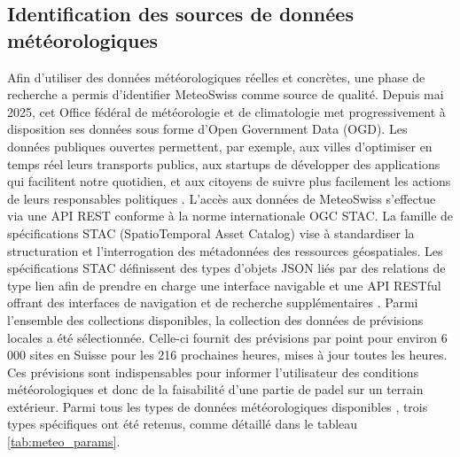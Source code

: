 \documentclass[12pt]{article}
\begin{document}
\subsection{Identification des sources de données météorologiques}

Afin d'utiliser des données météorologiques réelles et concrètes, une phase de recherche a permis d'identifier MeteoSwiss comme source de qualité. Depuis mai 2025, cet Office fédéral de météorologie et de climatologie met progressivement à disposition ses données sous forme d'Open Government Data (OGD). Les données publiques ouvertes permettent, par exemple, aux villes d'optimiser en temps réel leurs transports publics, aux startups de développer des applications qui facilitent notre quotidien, et aux citoyens de suivre plus facilement les actions de leurs responsables politiques \parencite{office_federal_de_la_statistique_quest-ce_2026}. 
\newline\newline
L'accès aux données de MeteoSwiss s'effectue via une API REST conforme à la norme internationale OGC STAC. La famille de spécifications STAC (SpatioTemporal Asset Catalog) vise à standardiser la structuration et l'interrogation des métadonnées des ressources géospatiales. Les spécifications STAC définissent des types d'objets JSON liés par des relations de type lien afin de prendre en charge une interface navigable et une API RESTful offrant des interfaces de navigation et de recherche supplémentaires \parencite[trad. de][]{open_geospatial_consortium_spatiotemporal_2025}.
\newline\newline
Parmi l'ensemble des collections disponibles, la collection des données de prévisions locales a été sélectionnée. Celle-ci fournit des prévisions par point pour environ 6 000 sites en Suisse pour les 216 prochaines heures, mises à jour toutes les heures. Ces prévisions sont indispensables pour informer l'utilisateur des conditions météorologiques et donc de la faisabilité d'une partie de padel sur un terrain extérieur. Parmi tous les types de données météorologiques disponibles \parencite{meteoswiss_local_2026}, trois types spécifiques ont été retenus, comme détaillé dans le tableau \ref{tab:meteo_params}.
\end{document}
